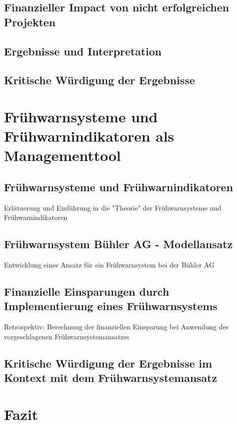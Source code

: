 \documentclass[11pt]{article}
\begin{document}
\subsection{Finanzieller Impact von nicht erfolgreichen Projekten}
\subsection{Ergebnisse und Interpretation}
\subsection{Kritische Würdigung der Ergebnisse}
\newpage
\section{Frühwarnsysteme und Frühwarnindikatoren als Managementtool}
\subsection{Frühwarnsysteme und Frühwarnindikatoren}
Erlätuerung und Einführung in die "Theorie" der Frühwarnsysteme und Frühwarnindikatoren
\subsection{Frühwarnsystem Bühler AG - Modellansatz}
Entwicklung eines Ansatz für ein Frühwarnsystem bei der Bühler AG
\subsection{Finanzielle Einsparungen durch Implementierung eines Frühwarnsystems}
Retrospektiv: Berechnung der finanziellen Einsparung bei Anwendung des vorgeschlagenen Frühwarnsystemansatzes
\newpage
\subsection{Kritische Würdigung der Ergebnisse im Kontext mit dem Frühwarnsystemansatz}
\newpage
\section{Fazit}
\end{document}
